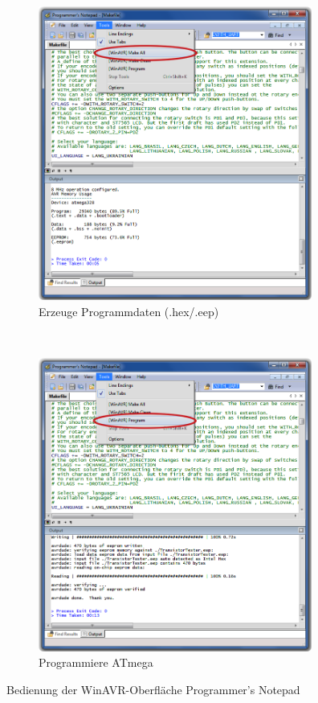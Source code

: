 \begin{figure}[H]
  \begin{subfigure}[b]{9cm}
    \centering
    \includegraphics[width=9cm]{../PNG/Notepad_make.png}
    \caption{Erzeuge Programmdaten (.hex/.eep)}
  \end{subfigure}
  ~
  \begin{subfigure}[b]{9cm}
    \centering
    \includegraphics[width=9cm]{../PNG/Notepad_program.png}
    \caption{Programmiere ATmega}
  \end{subfigure}
  \caption{Bedienung der WinAVR-Oberfläche Programmer's Notepad}
  \label{fig:WinAVR2}
\end{figure}


